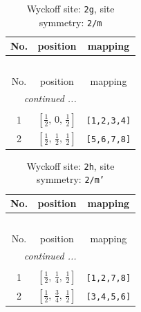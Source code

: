 \documentclass[fleqn,8pt]{jsarticle}
\begin{document}
\begin{longtable}{ccc}
\caption{Wyckoff site: {\tt 2g}, site symmetry: {\tt 2/m}}
 \\
 \hline \hline
No. & position & mapping \\ \hline \endfirsthead

\multicolumn{2}{l}{\tablename\ \thetable{}} \\
 \hline \hline
No. & position & mapping \\ \hline \endhead

 \hline \hline
\multicolumn{2}{r}{\footnotesize\it continued ...} \\ \endfoot

 \hline \hline
\multicolumn{2}{r}{} \\ \endlastfoot

1 & $\left[ \frac{1}{2},\, 0,\, \frac{1}{2} \right]$ & {\tt [1,2,3,4]} \\ \hline
2 & $\left[ \frac{1}{2},\, \frac{1}{2},\, \frac{1}{2} \right]$ & {\tt [5,6,7,8]} \\
\end{longtable}
\renewcommand{\arraystretch}{1.2}
\begin{longtable}{ccc}
\caption{Wyckoff site: {\tt 2h}, site symmetry: {\tt 2/m'}}
 \\
 \hline \hline
No. & position & mapping \\ \hline \endfirsthead

\multicolumn{2}{l}{\tablename\ \thetable{}} \\
 \hline \hline
No. & position & mapping \\ \hline \endhead

 \hline \hline
\multicolumn{2}{r}{\footnotesize\it continued ...} \\ \endfoot

 \hline \hline
\multicolumn{2}{r}{} \\ \endlastfoot

1 & $\left[ \frac{1}{2},\, \frac{1}{4},\, \frac{1}{2} \right]$ & {\tt [1,2,7,8]} \\ \hline
2 & $\left[ \frac{1}{2},\, \frac{3}{4},\, \frac{1}{2} \right]$ & {\tt [3,4,5,6]} \\
\end{longtable}
\renewcommand{\arraystretch}{1.2}
\end{document}
